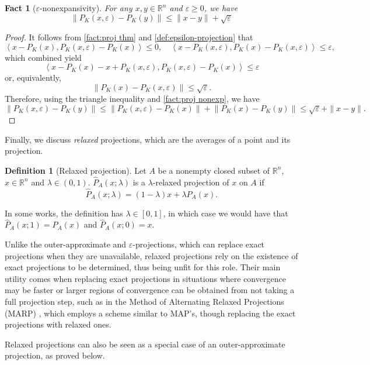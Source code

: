 \documentclass[smallextended,numbook,nospthms]{svjour3}
\theoremstyle{plain}
\newtheorem{fact}[theorem]{Fact}
\theoremstyle{definition}
\newtheorem{definition}[theorem]{Definition}
\def\RR{\mathds R}
\begin{document}
\begin{fact}[$\varepsilon$-nonexpansivity]
	For any $x, y \in \RR^{n}$ and $\varepsilon \geq 0$, we have
	$$
	\left\|P_{K}(x, \varepsilon)-P_{K}(y)\right\| \leq\|x-y\|+\sqrt{\varepsilon}
	$$
\end{fact}
\begin{proof}
	It follows from \cref{fact:proj thm} and \cref{def:epsilon-projection} that
	$$
	\left\langle x-P_{K}(x), P_{K}(x, \varepsilon)-P_{K}(x)\right\rangle \leq 0, \quad\left\langle x-P_{K}(x, \varepsilon), P_{K}(x)-P_{K}(x, \varepsilon)\right\rangle \leq \varepsilon,
	$$
	which combined yield
	$$
	\left\langle x-P_{K}(x)-x+P_{K}(x, \varepsilon), P_{K}(x, \varepsilon)-P_{K}(x)\right\rangle \leq \varepsilon
	$$
	or, equivalently,
	$$
	\left\|P_{K}(x)-P_{K}(x, \varepsilon)\right\| \leq \sqrt{\varepsilon}.
	$$
	Therefore, using the triangle inequality and \cref{fact:proj nonexp}, we have
	\[
	\left\|P_{K}(x, \varepsilon)-P_{K}(y)\right\| \leq\left\|P_{K}(x, \varepsilon)-P_{K}(x)\right\|+\left\|P_{K}(x)-P_{K}(y)\right\| \leq \sqrt{\varepsilon}+\|x-y\|.
	\]
\end{proof}

Finally, we discuss \emph{relaxed} projections, which are the averages of a point and its projection.

\begin{definition}[Relaxed projection]\label{def:relax proj}
	Let $A$ be a nonempty closed subset of $\RR^n$, $x \in \RR^n$ and $\lambda \in (0,1)$. $\hat{P}_{A}(x; \lambda)$ is a $\lambda$-relaxed projection of $x$ on $A$ if 
	$$
	\hat{P}_{A}(x; \lambda)=(1-\lambda)x+\lambda P_{A}(x).
	$$
\end{definition}
In some works, the definition has $\lambda \in [0,1]$, in which case we would have that $\hat{P}_{A}(x;1)=P_{A}(x)$ and $\hat{P}_{A}(x;0)=x$.

Unlike the outer-approximate and $\varepsilon$-projections, which can replace exact projections when they are unavailable, relaxed projections rely on the existence of exact projections to be determined, thus being unfit for this role. Their main utility comes when replacing exact projections in situations where convergence may be faster or larger regions of convergence can be obtained from not taking a full projection step, such as in the Method of Alternating Relaxed Projections (MARP) \cite{Bauschke:2013}, which employs a scheme similar to MAP's, though replacing the exact projections with relaxed ones.

Relaxed projections can also be seen as a special case of an outer-approximate projection, as proved below.
\end{document}
